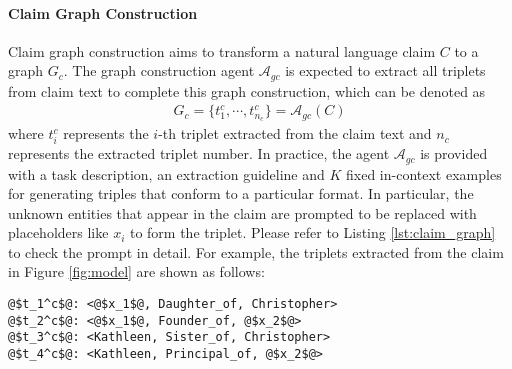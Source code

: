 \paragraph{Claim Graph Construction}
Claim graph construction aims to transform a natural language claim $C$ to a graph $G_c$. The graph construction agent $\mathcal{A}_{gc}$ is expected to extract all triplets from claim text to complete this graph construction, which can be denoted as
\begin{align}
    G_c = \{t^c_1, \cdots, t^c_{n_c}\} = \mathcal{A}_{gc}(C)
\end{align}
where $t^c_i$ represents the $i$-th triplet extracted from the claim text and $n_c$ represents the extracted triplet number. In practice, the agent $\mathcal{A}_{gc}$ is provided with a task description, an extraction guideline and $K$ fixed in-context examples for generating triples that conform to a particular format. In particular, the unknown entities that appear in the claim are prompted to be replaced with placeholders like $x_i$ to form the triplet. Please refer to Listing \ref{lst:claim_graph} to check the prompt in detail. For example, the triplets extracted from the claim in Figure \ref{fig:model} are shown as follows:

\begin{lstlisting}[style=myStyle*]
@$t_1^c$@: <@$x_1$@, Daughter_of, Christopher>
@$t_2^c$@: <@$x_1$@, Founder_of, @$x_2$@>
@$t_3^c$@: <Kathleen, Sister_of, Christopher>
@$t_4^c$@: <Kathleen, Principal_of, @$x_2$@>
\end{lstlisting}






